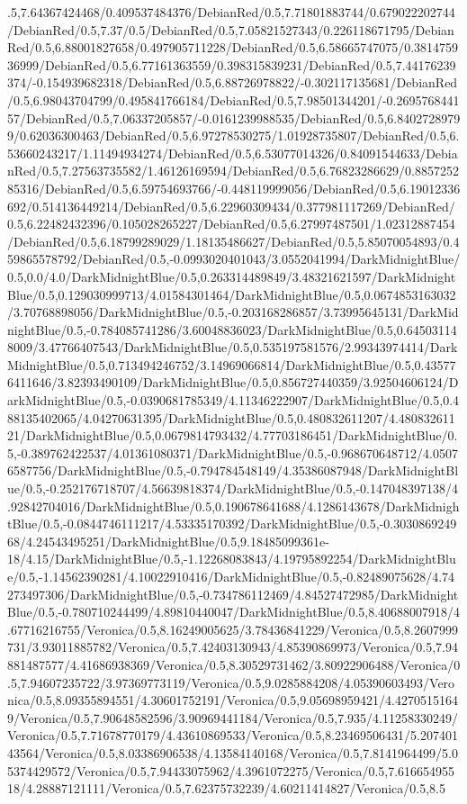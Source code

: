 {\begin{tikzternal}
.5,7.64367424468/0.409537484376/DebianRed/0.5,7.71801883744/0.679022202744/DebianRed/0.5,7.37/0.5/DebianRed/0.5,7.05821527343/0.226118671795/DebianRed/0.5,6.88001827658/0.497905711228/DebianRed/0.5,6.58665747075/0.381475936999/DebianRed/0.5,6.77161363559/0.398315839231/DebianRed/0.5,7.44176239374/-0.154939682318/DebianRed/0.5,6.88726978822/-0.302117135681/DebianRed/0.5,6.98043704799/0.495841766184/DebianRed/0.5,7.98501344201/-0.269576844157/DebianRed/0.5,7.06337205857/-0.0161239988535/DebianRed/0.5,6.84027289799/0.62036300463/DebianRed/0.5,6.97278530275/1.01928735807/DebianRed/0.5,6.53660243217/1.11494934274/DebianRed/0.5,6.53077014326/0.84091544633/DebianRed/0.5,7.27563735582/1.46126169594/DebianRed/0.5,6.76823286629/0.885725285316/DebianRed/0.5,6.59754693766/-0.448119999056/DebianRed/0.5,6.19012336692/0.514136449214/DebianRed/0.5,6.22960309434/0.377981117269/DebianRed/0.5,6.22482432396/0.105028265227/DebianRed/0.5,6.27997487501/1.02312887454/DebianRed/0.5,6.18799289029/1.18135486627/DebianRed/0.5,5.85070054893/0.459865578792/DebianRed/0.5,-0.0993020401043/3.0552041994/DarkMidnightBlue/0.5,0.0/4.0/DarkMidnightBlue/0.5,0.263314489849/3.48321621597/DarkMidnightBlue/0.5,0.129030999713/4.01584301464/DarkMidnightBlue/0.5,0.0674853163032/3.70768898056/DarkMidnightBlue/0.5,-0.203168286857/3.73995645131/DarkMidnightBlue/0.5,-0.784085741286/3.60048836023/DarkMidnightBlue/0.5,0.645031148009/3.47766407543/DarkMidnightBlue/0.5,0.535197581576/2.99343974414/DarkMidnightBlue/0.5,0.713494246752/3.14969066814/DarkMidnightBlue/0.5,0.435776411646/3.82393490109/DarkMidnightBlue/0.5,0.856727440359/3.92504606124/DarkMidnightBlue/0.5,-0.0390681785349/4.11346222907/DarkMidnightBlue/0.5,0.488135402065/4.04270631395/DarkMidnightBlue/0.5,0.480832611207/4.48083261121/DarkMidnightBlue/0.5,0.0679814793432/4.77703186451/DarkMidnightBlue/0.5,-0.389762422537/4.01361080371/DarkMidnightBlue/0.5,-0.968670648712/4.05076587756/DarkMidnightBlue/0.5,-0.794784548149/4.35386087948/DarkMidnightBlue/0.5,-0.252176718707/4.56639818374/DarkMidnightBlue/0.5,-0.147048397138/4.92842704016/DarkMidnightBlue/0.5,0.190678641688/4.1286143678/DarkMidnightBlue/0.5,-0.0844746111217/4.53335170392/DarkMidnightBlue/0.5,-0.303086924968/4.24543495251/DarkMidnightBlue/0.5,9.18485099361e-18/4.15/DarkMidnightBlue/0.5,-1.12268083843/4.19795892254/DarkMidnightBlue/0.5,-1.14562390281/4.10022910416/DarkMidnightBlue/0.5,-0.82489075628/4.74273497306/DarkMidnightBlue/0.5,-0.734786112469/4.84527472985/DarkMidnightBlue/0.5,-0.780710244499/4.89810440047/DarkMidnightBlue/0.5,8.40688007918/4.67716216755/Veronica/0.5,8.16249005625/3.78436841229/Veronica/0.5,8.2607999731/3.93011885782/Veronica/0.5,7.42403130943/4.85390869973/Veronica/0.5,7.94881487577/4.41686938369/Veronica/0.5,8.30529731462/3.80922906488/Veronica/0.5,7.94607235722/3.97369773119/Veronica/0.5,9.0285884208/4.05390603493/Veronica/0.5,8.09355894551/4.30601752191/Veronica/0.5,9.05698959421/4.42705151649/Veronica/0.5,7.90648582596/3.90969441184/Veronica/0.5,7.935/4.11258330249/Veronica/0.5,7.71678770179/4.43610869533/Veronica/0.5,8.23469506431/5.20740143564/Veronica/0.5,8.03386906538/4.13584140168/Veronica/0.5,7.8141964499/5.05374429572/Veronica/0.5,7.94433075962/4.3961072275/Veronica/0.5,7.61665495518/4.28887121111/Veronica/0.5,7.62375732239/4.60211414827/Veronica/0.5,8.5
\end{tikzternal}}
